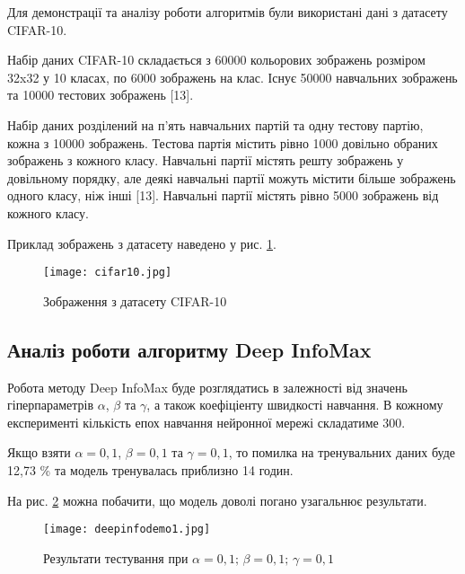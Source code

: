 Для демонстрації та аналізу роботи алгоритмів були використані дані з датасету CIFAR-10.

Набір даних CIFAR-10 складається з 60000 кольорових зображень розміром 32x32 у 10 класах, по 6000 зображень на клас. Існує 50000 навчальних зображень та 10000 тестових зображень [13].

Набір даних розділений на п’ять навчальних партій та одну тестову партію, кожна з 10000 зображень. Тестова партія містить рівно 1000 довільно обраних зображень з кожного класу. Навчальні партії містять решту зображень у довільному порядку, але деякі навчальні партії можуть містити більше зображень одного класу, ніж інші [13]. Навчальні партії містять рівно 5000 зображень від кожного класу.

Приклад зображень з датасету наведено у рис. \ref{fig:cifar10}.

\vspace{1em}

\begin{figure}[h]
  \texttt{[image: cifar10.jpg]}
  \caption{Зображення з датасету CIFAR-10}
  \label{fig:cifar10}
\end{figure}

\subsection{Аналіз роботи алгоритму Deep InfoMax}

Робота методу Deep InfoMax буде розглядатись в залежності від значень гіперпараметрів $\alpha$, $\beta$ та $\gamma$, а також коефіціенту швидкості навчання. В кожному експерименті кількість епох навчання нейронної мережі складатиме 300.

Якщо взяти $\alpha = 0,1$, $\beta = 0,1$ та $\gamma = 0,1$, то помилка на тренувальних даних буде 12,73 \% та модель тренувалась приблизно 14 годин.

На рис. \ref{fig:deepinfodemo1} можна побачити, що модель доволі погано узагальнює результати.

\vspace{1em}

\begin{figure}[h]
  \texttt{[image: deepinfodemo1.jpg]}
  \caption{Результати тестування при $\alpha = 0,1; \, \beta = 0,1; \, \gamma = 0,1$}
  \label{fig:deepinfodemo1}
\end{figure}

